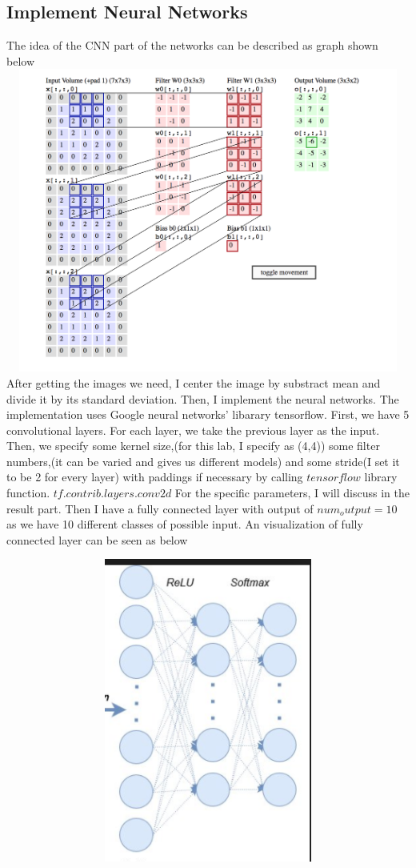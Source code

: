 \documentclass[a4paper,10pt]{article}
\begin{document}
\subsection{Implement Neural Networks}
The idea of the CNN part of the networks can be described as graph shown below
\includegraphics[width=135mm,height=100mm]{cnnstructure.png}\cite{cnnpic}
After getting the images we need, I center the image by substract mean and divide it by its standard deviation. Then, I implement the neural networks. The implementation uses Google neural networks' libarary tensorflow. First, we have 5 convolutional layers. For each layer, we take the previous layer as the input. Then, we specify some kernel size,(for this lab, I specify as (4,4)) some filter numbers,(it can be varied and gives us different models) and some stride(I set it to be 2 for every layer) with paddings if necessary by calling $tensorflow$ library function.  $tf.contrib.layers.conv2d$\cite{conv2d} For the specific parameters, I will discuss in the result part. Then I have a fully connected layer with output of $num_output=10$ as we have 10 different classes of possible input. An visualization of fully connected layer can be seen as below
\par
\includegraphics[width=135mm,height=100mm]{full.png}\cite{full}
\end{document}
